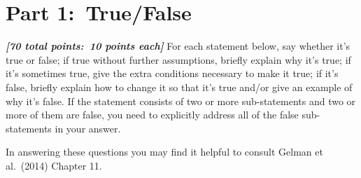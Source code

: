 \documentclass[12pt]{article}
\newcommand{\bi}[1]{\textbf{\textit{#1}}}
\begin{document}
\section*{Part 1:~True/False}

\bi{[70 total points:~10 points each]} For each statement below, say whether it's true or false; if true without further assumptions, briefly explain why it's true; if it's sometimes true, give the extra conditions necessary to make it true; if it's false, briefly explain how to change it so that it's true and/or give an example of why it's false. If the statement consists of two or more sub-statements and two or more of them are false, you need to explicitly address all of the false sub-statements in your answer.

In answering these questions you may find it helpful to consult Gelman et al.~(2014) Chapter 11.
\end{document}
